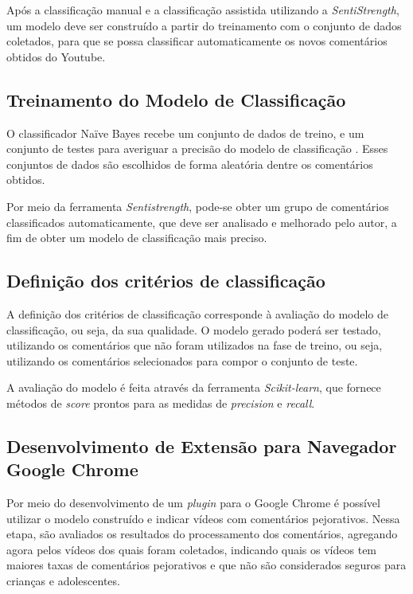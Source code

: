 Após a classificação manual e a classificação assistida utilizando a \textit{SentiStrength}, um modelo deve ser construído a partir do treinamento  com o conjunto de dados coletados, para que se  possa classificar automaticamente os novos comentários obtidos do Youtube.

\subsection{Treinamento do Modelo de Classificação}
O classificador Naïve Bayes recebe um conjunto de dados de treino, e um conjunto de testes para averiguar a precisão do modelo de classificação \cite{ZhangandLi2007Bayes}. Esses conjuntos de dados são escolhidos de forma aleatória dentre os comentários obtidos.

Por meio da ferramenta \textit{Sentistrength}, pode-se obter um grupo de comentários classificados automaticamente, que deve ser analisado e melhorado pelo autor, a fim de obter um modelo de classificação mais preciso.

\subsection{Definição dos critérios de classificação}
A definição dos critérios de classificação corresponde à avaliação do modelo de classificação, ou seja, da sua qualidade.
O modelo gerado poderá ser testado, utilizando os comentários que não foram utilizados na fase de treino, ou seja, utilizando os comentários selecionados para compor o conjunto de teste. 

A avaliação do modelo é feita através da ferramenta \textit{Scikit-learn}, que fornece métodos de \textit{score} prontos para as medidas de \textit{precision} e \textit{recall}.



\subsection{Desenvolvimento de Extensão para Navegador Google Chrome}

Por meio do desenvolvimento de um \textit{plugin} para o Google Chrome é possível utilizar o modelo construído e indicar vídeos com comentários pejorativos.
Nessa etapa, são avaliados os resultados do processamento dos comentários, agregando agora pelos vídeos dos quais foram coletados, indicando quais os vídeos tem maiores taxas de comentários pejorativos e que não são considerados seguros para crianças e adolescentes.

